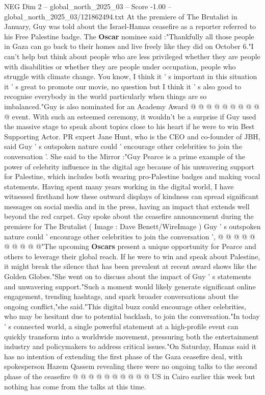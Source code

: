 \begin{textsample}{NEG Dim 2 – global\_north\_2025\_03 – Score -1.00 – global\_north\_2025\_03/121862494.txt}
At the premiere of The Brutalist in January, Guy was told about the Israel-Hamas ceasefire as a reporter referred to his Free Palestine badge.
The \textbf{Oscar} nominee said :"Thankfully all those people in Gaza can go back to their homes and live freely like they did on October 6."I can't help but think about people who are less privileged whether they are people with disabilities or whether they are people under occupation, people who struggle with climate change.
You know, I think it ' s important in this situation it ' s great to promote our movie, no question but I think it ' s also good to recognise everybody in the world particularly when things are so imbalanced."Guy is also nominated for an Academy Award @ @ @ @ @ @ @ @ @ @ event.
With such an esteemed ceremony, it wouldn't be a surprise if Guy used the massive stage to speak about topics close to his heart if he were to win Best Supporting Actor.
PR expert Jane Hunt, who is the CEO and co-founder of JBH, said Guy ' s outspoken nature could ' encourage other celebrities to join the conversation '.
She said to the Mirror :"Guy Pearce is a prime example of the power of celebrity influence in the digital age because of his unwavering support for Palestine, which includes both wearing pro-Palestine badges and making vocal statements.
Having spent many years working in the digital world, I have witnessed firsthand how these outward displays of kindness can spread significant messages on social media and in the press, having an impact that extends well beyond the red carpet.
Guy spoke about the ceasefire announcement during the premiere for The Brutalist ( Image : Dave Benett/WireImage ) Guy ' s outspoken nature could ' encourage other celebrities to join the conversation ', @ @ @ @ @ @ @ @ @ @"The upcoming \textbf{Oscars} present a unique opportunity for Pearce and others to leverage their global reach.
If he were to win and speak about Palestine, it might break the silence that has been prevalent at recent award shows like the Golden Globes."She went on to discuss about the impact of Guy ' s statements and unwavering support."Such a moment would likely generate significant online engagement, trending hashtags, and spark broader conversations about the ongoing conflict,"she said."This digital buzz could encourage other celebrities, who may be hesitant due to potential backlash, to join the conversation."In today ' s connected world, a single powerful statement at a high-profile event can quickly transform into a worldwide movement, pressuring both the entertainment industry and policymakers to address critical issues."On Saturday, Hamas said it has no intention of extending the first phase of the Gaza ceasefire deal, with spokesperson Hazem Qassem revealing there were no ongoing talks to the second phase of the ceasefire @ @ @ @ @ @ @ @ @ @ US in Cairo earlier this week but nothing has come from the talks at this time.

\end{textsample}
